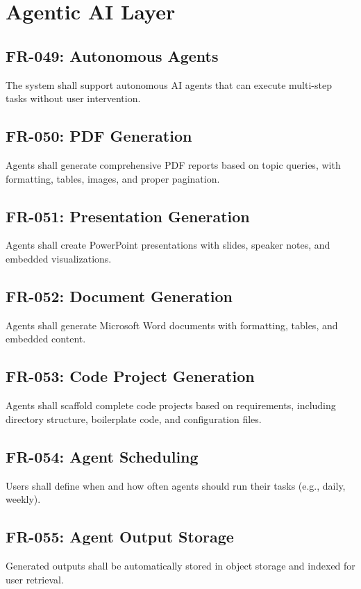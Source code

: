 \documentclass{report}
\begin{document}
\section{Agentic AI Layer}

\subsection{FR-049: Autonomous Agents}
The system shall support autonomous AI agents that can execute multi-step tasks without user intervention.

\subsection{FR-050: PDF Generation}
Agents shall generate comprehensive PDF reports based on topic queries, with formatting, tables, images, and proper pagination.

\subsection{FR-051: Presentation Generation}
Agents shall create PowerPoint presentations with slides, speaker notes, and embedded visualizations.

\subsection{FR-052: Document Generation}
Agents shall generate Microsoft Word documents with formatting, tables, and embedded content.

\subsection{FR-053: Code Project Generation}
Agents shall scaffold complete code projects based on requirements, including directory structure, boilerplate code, and configuration files.

\subsection{FR-054: Agent Scheduling}
Users shall define when and how often agents should run their tasks (e.g., daily, weekly).

\subsection{FR-055: Agent Output Storage}
Generated outputs shall be automatically stored in object storage and indexed for user retrieval.
\end{document}
